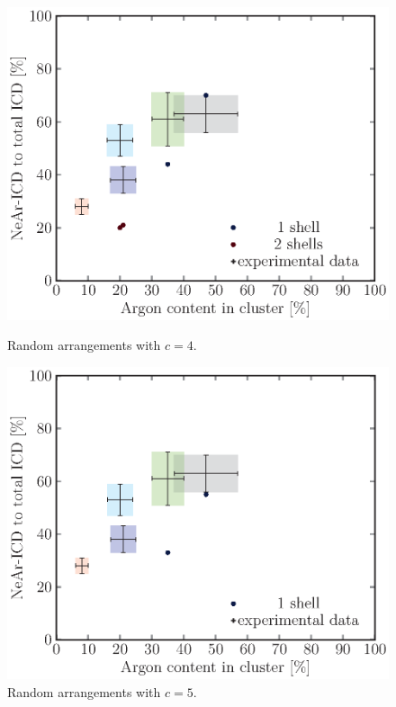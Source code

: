 \begin{figure}[!h]
\begin{minipage}{0.48\textwidth}
    \centering
    \includegraphics[scale=0.5]{pics/random04.ps}
    \caption{Random arrangements with $c=4$.}
    \label{random04}
\end{minipage}
\hfill
\begin{minipage}{0.48\textwidth}
    \centering
    \includegraphics[scale=0.5]{pics/random05.ps}
    \caption{Random arrangements with $c=5$.}
    \label{random05}
\end{minipage}
\end{figure}

